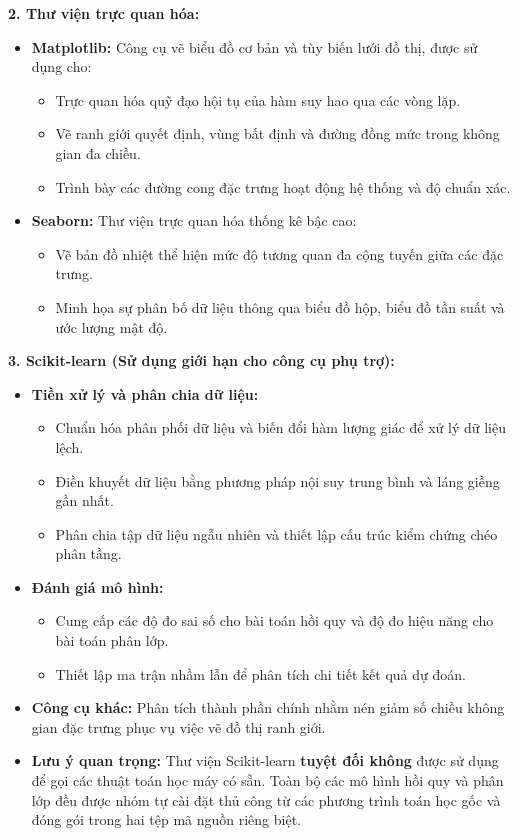\textbf{2. Thư viện trực quan hóa:}
\begin{itemize} [labelsep=10pt, leftmargin=2cm]
    \item \textbf{Matplotlib:} Công cụ vẽ biểu đồ cơ bản và tùy biến lưới đồ thị, được sử dụng cho:
    \begin{itemize}
        \item Trực quan hóa quỹ đạo hội tụ của hàm suy hao qua các vòng lặp.
        \item Vẽ ranh giới quyết định, vùng bất định và đường đồng mức trong không gian đa chiều.
        \item Trình bày các đường cong đặc trưng hoạt động hệ thống và độ chuẩn xác.
    \end{itemize}
    
    \item \textbf{Seaborn:} Thư viện trực quan hóa thống kê bậc cao:
    \begin{itemize}
        \item Vẽ bản đồ nhiệt thể hiện mức độ tương quan đa cộng tuyến giữa các đặc trưng.
        \item Minh họa sự phân bố dữ liệu thông qua biểu đồ hộp, biểu đồ tần suất và ước lượng mật độ.
    \end{itemize}
\end{itemize}

\textbf{3. Scikit-learn (Sử dụng giới hạn cho công cụ phụ trợ):}
\begin{itemize} [labelsep=10pt, leftmargin=2cm]
    \item \textbf{Tiền xử lý và phân chia dữ liệu:}
    \begin{itemize}
        \item Chuẩn hóa phân phối dữ liệu và biến đổi hàm lượng giác để xử lý dữ liệu lệch.
        \item Điền khuyết dữ liệu bằng phương pháp nội suy trung bình và láng giềng gần nhất.
        \item Phân chia tập dữ liệu ngẫu nhiên và thiết lập cấu trúc kiểm chứng chéo phân tầng.
    \end{itemize}
    
    \item \textbf{Đánh giá mô hình:}
    \begin{itemize}
        \item Cung cấp các độ đo sai số cho bài toán hồi quy và độ đo hiệu năng cho bài toán phân lớp.
        \item Thiết lập ma trận nhầm lẫn để phân tích chi tiết kết quả dự đoán.
    \end{itemize}

    \item \textbf{Công cụ khác:} Phân tích thành phần chính nhằm nén giảm số chiều không gian đặc trưng phục vụ việc vẽ đồ thị ranh giới.
    
    \item \textbf{Lưu ý quan trọng:} Thư viện Scikit-learn \textbf{tuyệt đối không} được sử dụng để gọi các thuật toán học máy có sẵn. Toàn bộ các mô hình hồi quy và phân lớp đều được nhóm tự cài đặt thủ công từ các phương trình toán học gốc và đóng gói trong hai tệp mã nguồn riêng biệt.
\end{itemize}

